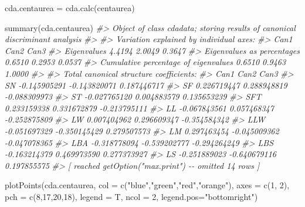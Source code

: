 \documentclass[
  11pt,
  a4paper]{article}
\newenvironment{Shaded}{\begin{snugshade}}{\end{snugshade}}
\newcommand{\AttributeTok}[1]{\textcolor[rgb]{0.77,0.63,0.00}{#1}}
\newcommand{\CommentTok}[1]{\textcolor[rgb]{0.56,0.35,0.01}{\textit{#1}}}
\newcommand{\DecValTok}[1]{\textcolor[rgb]{0.00,0.00,0.81}{#1}}
\newcommand{\FunctionTok}[1]{\textcolor[rgb]{0.00,0.00,0.00}{#1}}
\newcommand{\NormalTok}[1]{#1}
\newcommand{\OtherTok}[1]{\textcolor[rgb]{0.56,0.35,0.01}{#1}}
\newcommand{\StringTok}[1]{\textcolor[rgb]{0.31,0.60,0.02}{#1}}
\begin{document}
\begin{Shaded}
\begin{Highlighting}[]
\NormalTok{cda.centaurea }\OtherTok{=} \FunctionTok{cda.calc}\NormalTok{(centaurea)}

\FunctionTok{summary}\NormalTok{(cda.centaurea)}
\CommentTok{\#\textgreater{} Object of class \textquotesingle{}cdadata\textquotesingle{}; storing results of canonical discriminant analysis}
\CommentTok{\#\textgreater{} }
\CommentTok{\#\textgreater{} Variation explained by individual axes:}
\CommentTok{\#\textgreater{}                                        Can1   Can2   Can3}
\CommentTok{\#\textgreater{} Eigenvalues                          4.4194 2.0049 0.3647}
\CommentTok{\#\textgreater{} Eigenvalues as percentages           0.6510 0.2953 0.0537}
\CommentTok{\#\textgreater{} Cumulative percentage of eigenvalues 0.6510 0.9463 1.0000}
\CommentTok{\#\textgreater{} }
\CommentTok{\#\textgreater{} Total canonical structure coefficients:}
\CommentTok{\#\textgreater{}             Can1         Can2         Can3}
\CommentTok{\#\textgreater{} SN  {-}0.145905291 {-}0.143820071  0.187446717}
\CommentTok{\#\textgreater{} SF   0.226719447  0.288948819 {-}0.088309973}
\CommentTok{\#\textgreater{} ST  {-}0.027765120  0.004883579  0.135653239}
\CommentTok{\#\textgreater{} SFT  0.233159338  0.331672879 {-}0.213795111}
\CommentTok{\#\textgreater{} LL  {-}0.067843561  0.057468347 {-}0.252875809}
\CommentTok{\#\textgreater{} LW   0.007404962  0.296609347 {-}0.354584342}
\CommentTok{\#\textgreater{} LLW {-}0.051697329 {-}0.350145429  0.279507573}
\CommentTok{\#\textgreater{} LM   0.297463454 {-}0.045009362 {-}0.047078365}
\CommentTok{\#\textgreater{} LBA {-}0.318778094 {-}0.539202777 {-}0.294264249}
\CommentTok{\#\textgreater{} LBS {-}0.163214379  0.469973590  0.277373927}
\CommentTok{\#\textgreater{} LS  {-}0.251889023 {-}0.640679116  0.197855575}
\CommentTok{\#\textgreater{}  [ reached getOption("max.print") {-}{-} omitted 14 rows ]}
\end{Highlighting}
\end{Shaded}

\begin{Shaded}
\begin{Highlighting}[]
\FunctionTok{plotPoints}\NormalTok{(cda.centaurea, }\AttributeTok{col =} \FunctionTok{c}\NormalTok{(}\StringTok{"blue"}\NormalTok{,}\StringTok{"green"}\NormalTok{,}\StringTok{"red"}\NormalTok{,}\StringTok{"orange"}\NormalTok{), }\AttributeTok{axes =} \FunctionTok{c}\NormalTok{(}\DecValTok{1}\NormalTok{, }\DecValTok{2}\NormalTok{),}
           \AttributeTok{pch =} \FunctionTok{c}\NormalTok{(}\DecValTok{8}\NormalTok{,}\DecValTok{17}\NormalTok{,}\DecValTok{20}\NormalTok{,}\DecValTok{18}\NormalTok{), }\AttributeTok{legend =}\NormalTok{ T, }\AttributeTok{ncol =} \DecValTok{2}\NormalTok{, }\AttributeTok{legend.pos=}\StringTok{"bottomright"}\NormalTok{)}
\end{Highlighting}
\end{Shaded}
\end{document}
